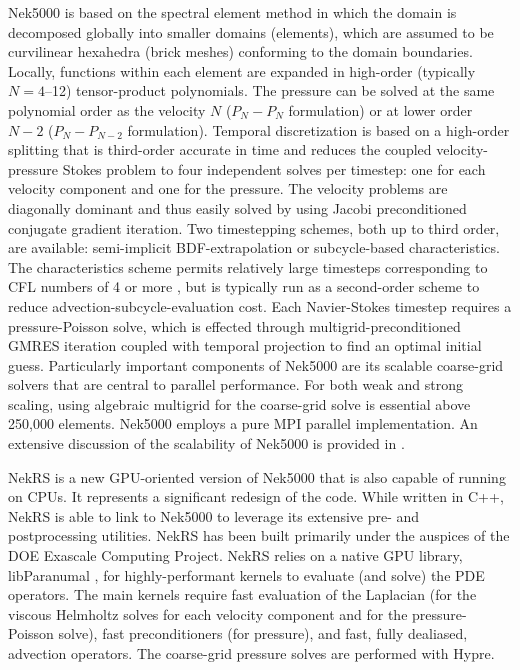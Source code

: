 \documentclass{anstrans}
\begin{document}
\medskip
Nek5000 is based on the spectral element method \cite{patera1984} in which the
domain is decomposed globally into smaller domains (elements), which are
assumed to be curvilinear hexahedra (brick meshes) conforming to the domain
boundaries. Locally, functions within each element are expanded in high-order
(typically $N=4$--12) tensor-product polynomials. The pressure can be solved
at the same polynomial order as the velocity $N$ ($P_{N} - P_{N}$ formulation)
or at lower order $N-2$ ($P_{N} - P_{N-2}$ formulation). Temporal
discretization is based on a high-order splitting that is third-order accurate
in time and reduces the coupled velocity-pressure Stokes problem to four
independent solves per timestep: one for each velocity component and one for
the pressure. The velocity problems are diagonally dominant and thus easily
solved by using Jacobi preconditioned conjugate gradient iteration. Two
timestepping schemes, both up to third order, are available: semi-implicit
BDF-extrapolation or subcycle-based characteristics. The characteristics
scheme permits relatively large timesteps corresponding to CFL numbers
of 4 or more \cite{patel19}, but is typically run as a second-order
scheme to reduce advection-subcycle-evaluation cost.  Each Navier-Stokes
timestep requires a pressure-Poisson solve, which is effected through
multigrid-preconditioned GMRES iteration coupled with temporal projection to
find an optimal initial guess.  Particularly important components of Nek5000
are its scalable coarse-grid solvers that are central to parallel performance.
For both weak and strong scaling, using algebraic multigrid for the coarse-grid
solve is essential above 250,000 elements. Nek5000 employs a pure MPI parallel
implementation. An extensive discussion of the scalability of Nek5000 is
provided in \cite{fischer15,fischer20a}.

\medskip
NekRS is a new GPU-oriented version of Nek5000  that is also capable of running
on CPUs. It represents a significant redesign of the code. While written in
C++, NekRS is able to link to Nek5000 to leverage its extensive pre- and
postprocessing utilities. NekRS has been built primarily under the auspices of
the DOE Exascale Computing Project.  NekRS relies on a native GPU library,
libParanumal \cite{libP}, for highly-performant kernels to evaluate (and
solve) the PDE operators.  The main kernels require fast evaluation of the 
Laplacian (for the viscous Helmholtz solves for each velocity component and
for the pressure-Poisson solve), fast preconditioners (for pressure), and
fast, fully dealiased, advection operators.  The coarse-grid pressure solves
are performed with Hypre.
\end{document}
